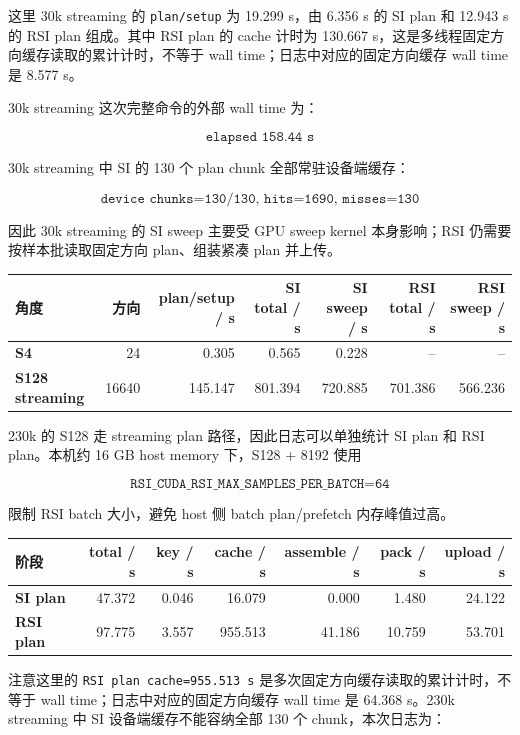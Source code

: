\documentclass[10pt]{article}
\newcommand{\subsect}[1]{\vspace{2mm}{\sffamily\large\bfseries #1}\par}
\newcommand{\code}[1]{\texttt{#1}}
\begin{document}
这里 30k streaming 的 \code{plan/setup} 为 19.299 s，由 6.356 s 的 SI plan 和 12.943 s 的 RSI plan 组成。其中 RSI plan 的 cache 计时为 130.667 s，这是多线程固定方向缓存读取的累计计时，不等于 wall time；日志中对应的固定方向缓存 wall time 是 8.577 s。

30k streaming 这次完整命令的外部 wall time 为：

\[
\code{elapsed\ 158.44\ s}
\]

30k streaming 中 SI 的 130 个 plan chunk 全部常驻设备端缓存：

\[
\code{device\ chunks=130/130,\ hits=1690,\ misses=130}
\]

因此 30k streaming 的 SI sweep 主要受 GPU sweep kernel 本身影响；RSI 仍需要按样本批读取固定方向 plan、组装紧凑 plan 并上传。

\subsect{8.3 230k streaming 计时}

\begin{tabularx}{\linewidth}{>{\bfseries}l r r r r r r}
\toprule
角度 & 方向 & plan/setup / s & SI total / s & SI sweep / s & RSI total / s & RSI sweep / s\\
\midrule
\rowcolor{softrow}
S4 & 24 & 0.305 & 0.565 & 0.228 & -- & --\\
S128 streaming & 16640 & 145.147 & 801.394 & 720.885 & 701.386 & 566.236\\
\bottomrule
\end{tabularx}

230k 的 S128 走 streaming plan 路径，因此日志可以单独统计 SI plan 和 RSI plan。本机约 16 GB host memory 下，S128 + 8192 使用

\[
\code{RSI\_CUDA\_RSI\_MAX\_SAMPLES\_PER\_BATCH=64}
\]

限制 RSI batch 大小，避免 host 侧 batch plan/prefetch 内存峰值过高。

\begin{tabularx}{\linewidth}{>{\bfseries}l r r r r r r}
\toprule
阶段 & total / s & key / s & cache / s & assemble / s & pack / s & upload / s\\
\midrule
\rowcolor{softrow}
SI plan & 47.372 & 0.046 & 16.079 & 0.000 & 1.480 & 24.122\\
RSI plan & 97.775 & 3.557 & 955.513 & 41.186 & 10.759 & 53.701\\
\bottomrule
\end{tabularx}

注意这里的 \code{RSI plan cache=955.513 s} 是多次固定方向缓存读取的累计计时，不等于 wall time；日志中对应的固定方向缓存 wall time 是 64.368 s。230k streaming 中 SI 设备端缓存不能容纳全部 130 个 chunk，本次日志为：
\end{document}

